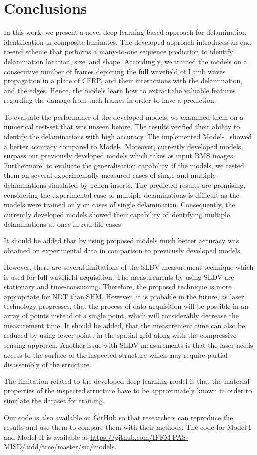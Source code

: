 \section{Conclusions}
\label{conclusion}
In this work, we present a novel deep learning-based approach for delamination identification in composite laminates.
The developed approach introduces an end-to-end scheme that performs a many-to-one sequence prediction to identify delamination location, size, and shape.
Accordingly, we trained the models on a consecutive number of frames depicting the full wavefield of Lamb waves propagation in a plate of CFRP, and their interactions with the delamination, and the edges.
Hence, the models learn how to extract the valuable features regarding the damage from such frames in order to have a prediction.

To evaluate the performance of the developed models, we examined them on a numerical test-set that was unseen before.
The results verified their ability to identify the delaminations with high accuracy. 
The implemented Model-~ showed a better accuracy compared to Model-.
Moreover, currently developed models surpass our previously developed models which takes as input RMS images.
Furthermore, to evaluate the generalisation capability of the models, we tested them on several experimentally measured cases of single and multiple delaminations simulated by Teflon inserts.
The predicted results are promising, considering the experimental case of multiple delaminations is difficult as the models were trained only on cases of single delamination.
Consequently, the currently developed models showed their capability of identifying multiple delaminations at once in real-life cases.

It should be added that by using proposed models much better accuracy was obtained on experimental data in comparison to previously developed models.

However, there are several limitations of the SLDV measurement technique which is used for full wavefield acquisition.
The measurements by using SLDV are stationary and time-consuming.
Therefore, the proposed technique is more appropriate for NDT than SHM.
However, it is probable in the future, as
laser technology progresses, that the process of data acquisition will be possible in an array of points instead of a single point, which will considerably decrease the measurement time.
It should be added, that the measurement time can also be reduced by using fewer points in the spatial grid along with the compressive sensing approach.
Another issue with SLDV measurements is that the laser needs access to the surface of the inspected structure which may require partial disassembly of the structure.

The limitation related to the developed deep learning model is that the material properties of the inspected structure have to be approximately known in order to simulate the dataset for training.

Our code is also available on GitHub so that researchers can reproduce the results and use them to compare them with their methods. 
The code for Model-I and Model-II is available at \url{https://github.com/IFFM-PAS-MISD/aidd/tree/master/src/models}.

